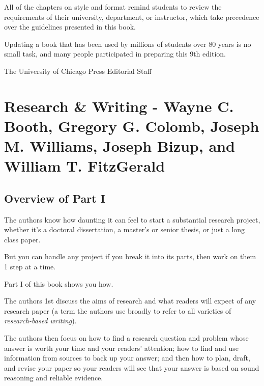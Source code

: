 \documentclass[oneside]{book}
\numberwithin{equation}{section}
\begin{document}
All of the chapters on style and format remind students to review the requirements of their university, department, or instructor, which take precedence over the guidelines presented in this book.

%
Updating a book that has been used by millions of students over 80 years is no small task, and many people participated in preparing this 9th edition.
\begin{flushright}
    The University of Chicago Press Editorial Staff
\end{flushright}

\part{Research \& Writing - Wayne C. Booth, Gregory G. Colomb, Joseph M. Williams, Joseph Bizup, and William T. FitzGerald}

\chapter*{Overview of Part I}
The authors know how daunting it can feel to start a substantial research project, whether it's a doctoral dissertation, a master's or senior thesis, or just a long class paper.

But you can handle any project if you break it into its parts, then work on them 1 step at a time.

Part I of this book shows you how.

%
The authors 1st discuss the aims of research and what readers will expect of any research paper (a term the authors use broadly to refer to all varieties of \textit{research-based writing}).

The authors then focus on how to find a research question and problem whose answer is worth your time and your readers' attention; how to find and use information from sources to back up your answer; and then how to plan, draft, and revise your paper so your readers will see that your answer is based on sound reasoning and reliable evidence.
\end{document}
